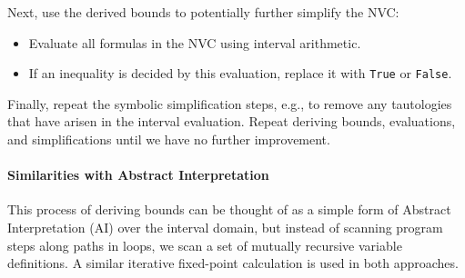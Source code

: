 \documentclass[runningheads]{llncs}
\begin{document}
Next, use the derived bounds to potentially further simplify  the NVC:
\begin{itemize}
  \item Evaluate all formulas in the NVC using interval arithmetic.
  \item If an inequality is decided by this evaluation, replace it with \lstinline{True} or \lstinline{False}.
\end{itemize}

Finally, repeat the symbolic simplification steps, e.g., to remove any tautologies that have arisen in the interval evaluation.
Repeat deriving bounds, evaluations, and simplifications until we have no further improvement.

\paragraph{Similarities with Abstract Interpretation}

This process of deriving bounds can be thought of as a simple form of Abstract Interpretation (AI) over the interval domain, but instead of scanning program steps along paths in loops, we scan a set of mutually recursive variable definitions.
A similar iterative fixed-point calculation is used in both approaches.


\end{document}
